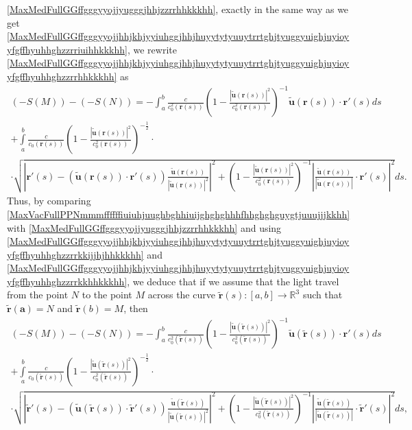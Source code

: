 \documentclass{article}
\theoremstyle{definition}
\theoremstyle{remark}
\renewcommand{\vec}[1]{\mathbf{#1}}
\newcommand{\er}{\eqref}
\newcommand{\er}{\eqref}
\begin{document}
\er{MaxMedFullGGffgggyyojjyugggjhhjzzrrhhkkkhh}, exactly in the same
way as we get
\er{MaxMedFullGGffgggyyojjhhjkhjyyiuhggjhhjhuyytytyuuytrrtghjtyuggyuighjuyioyyfgffhyuhhghzzrriuihhkkkhh},
we rewrite
\er{MaxMedFullGGffgggyyojjhhjkhjyyiuhggjhhjhuyytytyuuytrrtghjtyuggyuighjuyioyyfgffhyuhhghzzrrhhkkkhh}
as
\begin{multline}\label{MaxMedFullGGffgggyyojjhhjkhjyyiuhggjhhjhuyytytyuuytrrtghjtyuggyuighjuyioyyfgffhyuhhghzzrrkkhhkkkhh}
\left(-S(M)\right)-
\left(-S(N)\right)=-\int_a^b\frac{c}{c^2_0\left(\vec
r(s)\right)}\left(1-\frac{\left|\vec {\tilde u}\left(\vec
r(s)\right)\right|^2}{c^2_0\left(\vec r(s)\right)}\right)^{-1}\vec
{\tilde u}\left(\vec r(s)\right)\cdot\vec
r'(s)ds\\+\int\limits_a^b\frac{c}{c_0\left(\vec
r(s)\right)}\left(1-\frac{\left|\vec {\tilde u}\left(\vec
r(s)\right)\right|^2}{c^2_0\left(\vec
r(s)\right)}\right)^{-\frac{1}{2}}
\cdot\\
\cdot\sqrt{\left|\vec r'(s)-\left(\vec {\tilde u}\left(\vec
r(s)\right)\cdot\vec r'(s)\right)\frac{\vec {\tilde u}\left(\vec
r(s)\right)}{\left|\vec {\tilde u}\left(\vec
r(s)\right)\right|^2}\right|^2+\left(1-\frac{\left|\vec {\tilde
u}\left(\vec r(s)\right)\right|^2}{c^2_0\left(\vec
r(s)\right)}\right)^{-1}\left|\frac{\vec {\tilde u}\left(\vec
r(s)\right)}{\left|\vec {\tilde u}\left(\vec
r(s)\right)\right|}\cdot\vec r'(s)\right|^2}ds.
\end{multline}
Thus, by comparing
\er{MaxVacFullPPNmmmffffffiuiuhjuughbghhiuijghghghhhfhhghghguygtjuuujjjkkhh}
with \er{MaxMedFullGGffgggyyojjyugggjhhjzzrrhhkkkhh} and using
\er{MaxMedFullGGffgggyyojjhhjkhjyyiuhggjhhjhuyytytyuuytrrtghjtyuggyuighjuyioyyfgffhyuhhghzzrrkkijjhjhhkkkhh}
and
\er{MaxMedFullGGffgggyyojjhhjkhjyyiuhggjhhjhuyytytyuuytrrtghjtyuggyuighjuyioyyfgffhyuhhghzzrrkkhhkkkhh},
we deduce that if we assume that the light travel from the point $N$
to the point $M$ across the curve $\vec {\tilde
r}(s):[a,b]\to\mathbb{R}^3$ such that $\vec{\tilde r(a)}=N$ and
$\vec {\tilde r}(b)=M$, then
\begin{multline}\label{MaxMedFullGGffgggyyojjhhjkhjyyiuhggjhhjhuyytytyuuytrrtghjtyuggyuighjuyioyyfgffhyuhhghzzrrkkhhkkkhhhhh}
\left(-S(M)\right)-
\left(-S(N)\right)=-\int_a^b\frac{c}{c^2_0\left(\vec{\tilde
r}(s)\right)}\left(1-\frac{\left|\vec {\tilde u}\left(\vec{\tilde
r}(s)\right)\right|^2}{c^2_0\left(\vec{\tilde
r}(s)\right)}\right)^{-1}\vec {\tilde u}\left(\vec{\tilde
r}(s)\right)\cdot\vec
r'(s)ds\\+\int\limits_a^b\frac{c}{c_0\left(\vec{\tilde
r}(s)\right)}\left(1-\frac{\left|\vec {\tilde u}\left(\vec{\tilde
r}(s)\right)\right|^2}{c^2_0\left(\vec{\tilde
r}(s)\right)}\right)^{-\frac{1}{2}}
\cdot\\
\cdot\sqrt{\left|\vec{\tilde r}'(s)-\left(\vec {\tilde
u}\left(\vec{\tilde r}(s)\right)\cdot\vec{\tilde
r}'(s)\right)\frac{\vec {\tilde u}\left(\vec{\tilde
r}(s)\right)}{\left|\vec {\tilde u}\left(\vec{\tilde
r}(s)\right)\right|^2}\right|^2+\left(1-\frac{\left|\vec {\tilde
u}\left(\vec{\tilde r}(s)\right)\right|^2}{c^2_0\left(\vec{\tilde
r}(s)\right)}\right)^{-1}\left|\frac{\vec {\tilde
u}\left(\vec{\tilde r}(s)\right)}{\left|\vec {\tilde
u}\left(\vec{\tilde r}(s)\right)\right|}\cdot\vec{\tilde
r}'(s)\right|^2}ds,
\end{multline}
\end{document}
